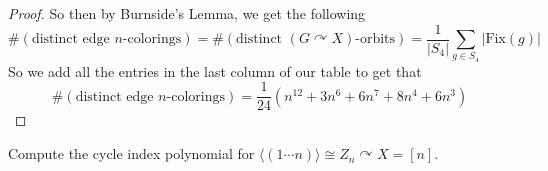 \documentclass[addpoints,10pt]{exam}
\theoremstyle{plain}
\theoremstyle{definition}
\newtheorem{prob}[thm]{Problem}
\theoremstyle{plain}
\theoremstyle{plain}
\theoremstyle{definition}
\let\oldprob\prob
\let\endoldprob\endprob
\renewenvironment{prob}
  {\begin{singlespace}\oldprob}
  {\endoldprob\end{singlespace}}
\begin{document}
\begin{proof}
\noindent So then by Burnside's Lemma, we get the following
\[
\#(\text{distinct edge } n\text{-colorings}) = \#(\text{distinct $(G\curvearrowright X)$-orbits})= \frac{1}{|S_{4}|}\sum_{g\in S_4}|\mathrm{Fix}(g)|
\]
So we add all the entries in the last column of our table to get that
\[
\#(\text{distinct edge $n$-colorings}) = \frac{1}{24}\left(n^{12} + 3n^6 + 6n^7 + 8n^4 + 6n^3\right)
\]

\end{proof}


\newpage
\setcounter{thm}{10}
\renewcommand{\thethm}{\arabic{thm}(a)}

\begin{prob}
Compute the cycle index polynomial for $\langle (1\cdots n)\rangle \cong Z_{n}\curvearrowright X= [n].$
\end{prob}
\end{document}
